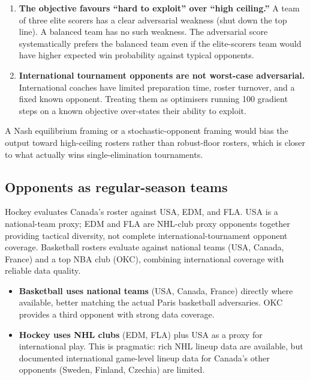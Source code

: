 \documentclass[12pt,letterpaper]{article}
\begin{document}
\begin{enumerate}[leftmargin=*]
  \item \textbf{The objective favours ``hard to exploit'' over ``high
    ceiling.''} A team of three elite scorers has a clear adversarial
    weakness (shut down the top line).
    A balanced team has no such weakness.
    The adversarial score systematically prefers the balanced team even
    if the elite-scorers team would have higher expected win probability
    against typical opponents.
  \item \textbf{International tournament opponents are not worst-case
    adversarial.} International coaches have limited preparation time,
    roster turnover, and a fixed known opponent.
    Treating them as optimisers running 100 gradient steps on a known
    objective over-states their ability to exploit.
\end{enumerate}

A Nash equilibrium framing or a stochastic-opponent framing would bias
the output toward high-ceiling rosters rather than robust-floor rosters,
which is closer to what actually wins single-elimination tournaments.

\subsection{Opponents as regular-season teams}

Hockey evaluates Canada's roster against USA, EDM, and FLA.
USA is a national-team proxy; EDM and FLA are NHL-club proxy opponents
together providing tactical diversity, not complete
international-tournament opponent coverage.
Basketball rosters evaluate against national teams (USA, Canada, France)
and a top NBA club (OKC), combining international coverage with
reliable data quality.

\begin{itemize}[leftmargin=*]
  \item \textbf{Basketball uses national teams} (USA, Canada, France)
    directly where available, better matching the actual Paris basketball
    adversaries.
    OKC provides a third opponent with strong data coverage.
  \item \textbf{Hockey uses NHL clubs} (EDM, FLA) plus USA as a proxy
    for international play.
    This is pragmatic: rich NHL lineup data are available, but documented
    international game-level lineup data for Canada's other opponents
    (Sweden, Finland, Czechia) are limited.
\end{itemize}
\end{document}
